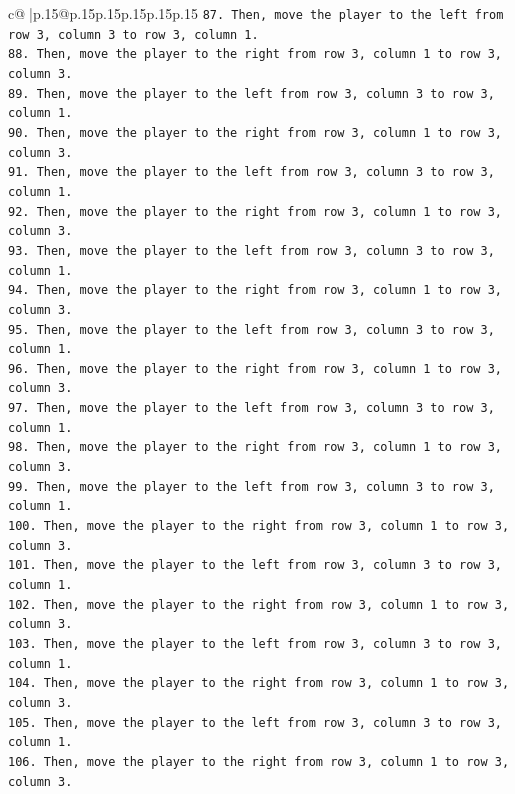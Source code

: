 \documentclass{article}
\begin{document}
{\begin{supertabular}{c@{$\;$}|p{.15\linewidth}@{}p{.15\linewidth}p{.15\linewidth}p{.15\linewidth}p{.15\linewidth}p{.15\linewidth}}
{{{\texttt{87. Then, move the player to the left from row 3, column 3 to row 3, column 1.} \\
\texttt{88. Then, move the player to the right from row 3, column 1 to row 3, column 3.} \\
\texttt{89. Then, move the player to the left from row 3, column 3 to row 3, column 1.} \\
\texttt{90. Then, move the player to the right from row 3, column 1 to row 3, column 3.} \\
\texttt{91. Then, move the player to the left from row 3, column 3 to row 3, column 1.} \\
\texttt{92. Then, move the player to the right from row 3, column 1 to row 3, column 3.} \\
\texttt{93. Then, move the player to the left from row 3, column 3 to row 3, column 1.} \\
\texttt{94. Then, move the player to the right from row 3, column 1 to row 3, column 3.} \\
\texttt{95. Then, move the player to the left from row 3, column 3 to row 3, column 1.} \\
\texttt{96. Then, move the player to the right from row 3, column 1 to row 3, column 3.} \\
\texttt{97. Then, move the player to the left from row 3, column 3 to row 3, column 1.} \\
\texttt{98. Then, move the player to the right from row 3, column 1 to row 3, column 3.} \\
\texttt{99. Then, move the player to the left from row 3, column 3 to row 3, column 1.} \\
\texttt{100. Then, move the player to the right from row 3, column 1 to row 3, column 3.} \\
\texttt{101. Then, move the player to the left from row 3, column 3 to row 3, column 1.} \\
\texttt{102. Then, move the player to the right from row 3, column 1 to row 3, column 3.} \\
\texttt{103. Then, move the player to the left from row 3, column 3 to row 3, column 1.} \\
\texttt{104. Then, move the player to the right from row 3, column 1 to row 3, column 3.} \\
\texttt{105. Then, move the player to the left from row 3, column 3 to row 3, column 1.} \\
\texttt{106. Then, move the player to the right from row 3, column 1 to row 3, column 3.} \\
}}}
\end{supertabular}}
\end{document}
